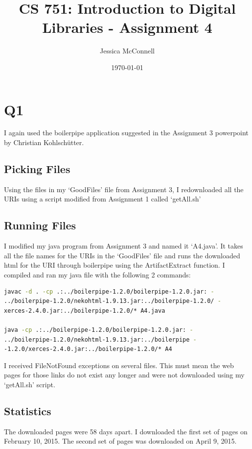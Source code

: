 \documentclass[12pt]{article}
\title{CS 751: Introduction to Digital Libraries - Assignment 4}
\author{Jessica McConnell}
\date{\today}
\begin{document}
\sloppy
\maketitle

\section{Q1}

I again used the boilerpipe application suggested in the Assignment 3 powerpoint by Christian Kohlschütter. \cite{Kohlschütter:2011:boilerpipe}

\subsection{Picking Files}
Using the files in my `GoodFiles' file from Assignment 3, I redownloaded all the URIs using a script modified from Assignment 1 called `getAll.sh'

\subsection{Running Files}
I modified my java program from Assignment 3 and named it `A4.java'.  It takes all the file names for the URIs in the `GoodFiles' file and runs the downloaded html for the URI through boilerpipe using the ArtifactExtract function.  I compiled and ran my java file with the following 2 commands:

\begin{lstlisting}[language=bash]
javac -d . -cp .:../boilerpipe-1.2.0/boilerpipe-1.2.0.jar: - 
../boilerpipe-1.2.0/nekohtml-1.9.13.jar:../boilerpipe-1.2.0/ - 
xerces-2.4.0.jar:../boilerpipe-1.2.0/* A4.java

java -cp .:../boilerpipe-1.2.0/boilerpipe-1.2.0.jar: - 
../boilerpipe-1.2.0/nekohtml-1.9.13.jar:../boilerpipe - 
-1.2.0/xerces-2.4.0.jar:../boilerpipe-1.2.0/* A4
\end{lstlisting}

I received FileNotFound exceptions on several files.  This must mean the web pages for those links do not exist any longer and were not downloaded using my `getAll.sh' script.

\subsection{Statistics}
The downloaded pages were 58 days apart. I downloaded the first set of pages on February 10, 2015. The second set of pages was downloaded on April 9, 2015.
\end{document}
